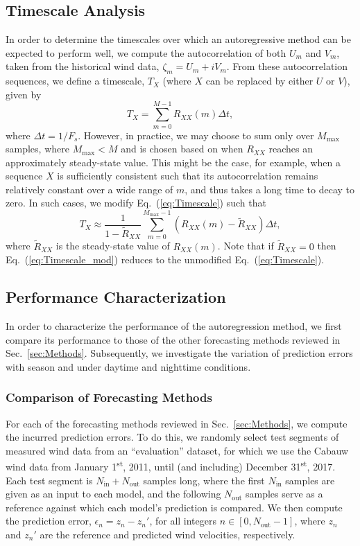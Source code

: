 \documentclass[11pt, oneside]{article}
\newcommand{\eqnref}[1]{Eq.~(\ref{#1})}
\newcommand{\secref}[1]{Sec.~\ref{#1}}
\begin{document}
\subsection{Timescale Analysis}
In order to determine the timescales over which an autoregressive method can be expected to perform well, we compute the autocorrelation of both $U_m$ and $V_m$, taken from the historical wind data, $\zeta_m = U_m + i V_m$.
From these autocorrelation sequences, we define a timescale, $T_X$ (where $X$ can be replaced by either $U$ or $V$), given by
\begin{equation}\label{eq:Timescale}
T_X = \sum_{m = 0}^{M-1} R_{XX}(m) \Delta t,
\end{equation}
where $\Delta t = 1/F_s$.
However, in practice, we may choose to sum only over $M_\text{max}$ samples, where $M_\text{max} < M$ and is chosen based on when $R_{XX}$ reaches an approximately steady-state value.
This might be the case, for example, when a sequence $X$ is sufficiently consistent such that its autocorrelation remains relatively constant over a wide range of $m$, and thus takes a long time to decay to zero.
In such cases, we modify \eqnref{eq:Timescale} such that
\begin{equation}\label{eq:Timescale_mod}
T_X \approx \frac{1}{1 - \tilde{R}_{XX}} \sum_{m = 0}^{M_\text{max}-1} (R_{XX}(m) - \tilde{R}_{XX}) \Delta t,
\end{equation}
where $\tilde{R}_{XX}$ is the steady-state value of $R_{XX}(m)$.
Note that if $\tilde{R}_{XX} = 0$ then \eqnref{eq:Timescale_mod} reduces to the unmodified \eqnref{eq:Timescale}.

\subsection{Performance Characterization}
In order to characterize the performance of the autoregression method, we first compare its performance to those of the other forecasting methods reviewed in \secref{sec:Methods}.
Subsequently, we investigate the variation of prediction errors with season and under daytime and nighttime conditions.

\subsubsection{Comparison of Forecasting Methods}\label{sec:Methodology:Comparison}
For each of the forecasting methods reviewed in \secref{sec:Methods}, we compute the incurred prediction errors.
To do this, we randomly select test segments of measured wind data from an ``evaluation'' dataset, for which we use the Cabauw wind data from January 1\textsuperscript{st}, 2011, until (and including) December 31\textsuperscript{st}, 2017.
Each test segment is $N_\text{in} + N_\text{out}$ samples long, where the first $N_\text{in}$ samples are given as an input to each model, and the following $N_\text{out}$ samples serve as a reference against which each model's prediction is compared.
We then compute the prediction error, $\epsilon_n = z_n - z_n'$, for all integers $n \in [0,N_\text{out}-1]$, where $z_n$ and $z_n'$ are the reference and predicted wind velocities, respectively.
\end{document}
